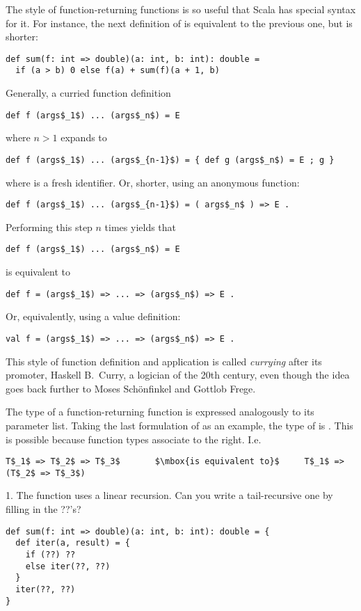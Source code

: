 The style of function-returning functions is so useful that Scala has
special syntax for it. For instance, the next definition of 
is equivalent to the previous one, but is shorter:
\begin{lstlisting}
def sum(f: int => double)(a: int, b: int): double =
  if (a > b) 0 else f(a) + sum(f)(a + 1, b)
\end{lstlisting}
Generally, a curried function definition 
\begin{lstlisting}
def f (args$_1$) ... (args$_n$) = E
\end{lstlisting}
where $n > 1$ expands to
\begin{lstlisting}
def f (args$_1$) ... (args$_{n-1}$) = { def g (args$_n$) = E ; g }
\end{lstlisting}
where  is a fresh identifier. Or, shorter, using an anonymous function:
\begin{lstlisting}
def f (args$_1$) ... (args$_{n-1}$) = ( args$_n$ ) => E .
\end{lstlisting}
Performing this step $n$ times yields that
\begin{lstlisting}
def f (args$_1$) ... (args$_n$) = E
\end{lstlisting}
is equivalent to
\begin{lstlisting}
def f = (args$_1$) => ... => (args$_n$) => E .
\end{lstlisting}
Or, equivalently, using a value definition:
\begin{lstlisting}
val f = (args$_1$) => ... => (args$_n$) => E .
\end{lstlisting}
This style of function definition and application is called {\em
currying} after its promoter, Haskell B.\ Curry, a logician of the
20th century, even though the idea goes back further to Moses
Sch\"onfinkel and Gottlob Frege.

The type of a function-returning function is expressed analogously to
its parameter list. Taking the last formulation of  as an example,
the type of  is .
This is possible because function types associate to the right. I.e.
\begin{lstlisting}
T$_1$ => T$_2$ => T$_3$       $\mbox{is equivalent to}$     T$_1$ => (T$_2$ => T$_3$)
\end{lstlisting}


\begin{exercise}
1. The  function uses a linear recursion. Can you write a
tail-recursive one by filling in the ??'s?

\begin{lstlisting}
def sum(f: int => double)(a: int, b: int): double = {
  def iter(a, result) = {
    if (??) ??
    else iter(??, ??)
  }
  iter(??, ??)
}
\end{lstlisting}
\end{exercise}

